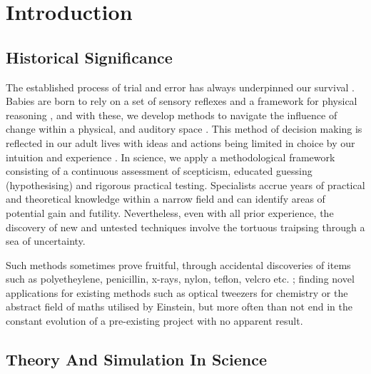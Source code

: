 
\section{Introduction}

\subsection{Historical Significance}
The established process of trial and error has always underpinned our survival \citep{TrialandError}. Babies are born to rely on a set of sensory reflexes and a framework for physical reasoning \citep{pr}, and with these, we develop methods to navigate the influence of change within a physical, and auditory space \citep{objects}. This method of decision making is reflected in our adult lives with ideas and actions being limited in choice by our intuition and experience \citep{descartes}. In science, we apply a methodological framework consisting of a continuous assessment of scepticism, educated guessing (hypothesising) and rigorous practical testing. Specialists accrue years of practical and theoretical knowledge within a narrow field and can identify areas of potential gain and futility. Nevertheless, even with all prior experience, the discovery of new and untested techniques involve the tortuous traipsing through a sea of uncertainty.

 Such methods sometimes prove fruitful, through accidental discoveries of items such as polyetheylene, penicillin, x-rays, nylon, teflon, velcro etc.   \citep{accidental,serendipity}; finding novel applications for existing methods such as optical tweezers for chemistry or the abstract field of maths utilised by Einstein, but more often than not end in the constant evolution of a pre-existing project with no apparent result.

\subsection{Theory And Simulation In Science}

